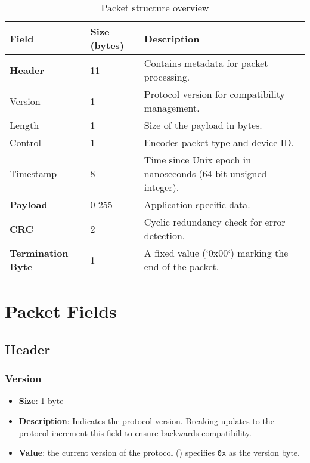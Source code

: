 \documentclass[a4paper,11pt,english]{article}
\begin{document}
\begin{table}[h]
  \centering
  \begin{tabular}{lll}
    \toprule
    Field                     & Size (bytes) & Description                                                     \\
    \midrule
    \textbf{Header}           & 11           & Contains metadata for packet processing.                        \\
    Version                   & 1            & Protocol version for compatibility management.                  \\
    Length                    & 1            & Size of the payload in bytes.                                   \\
    Control                   & 1            & Encodes packet type and device ID.                              \\
    Timestamp                 & 8            & Time since Unix epoch in nanoseconds (64-bit unsigned integer). \\
    \textbf{Payload}          & 0-255        & Application-specific data.                                      \\
    \textbf{CRC}              & 2            & Cyclic redundancy check for error detection.                    \\
    \textbf{Termination Byte} & 1            & A fixed value (`0x00`) marking the end of the packet.           \\
    \bottomrule
  \end{tabular}
  \caption{Packet structure overview}
  \label{table:struct}
\end{table}

\section{Packet Fields}

\subsection{Header}

\subsubsection{Version}
\begin{itemize}
  \item \textbf{Size}: 1 byte
  \item \textbf{Description}: Indicates the protocol version. Breaking updates to the protocol increment this field to ensure backwards compatibility.
  \item \textbf{Value}: the current version of the protocol (\version) specifies \texttt{0x\versionbyte} as the version byte.
\end{itemize}
\end{document}
